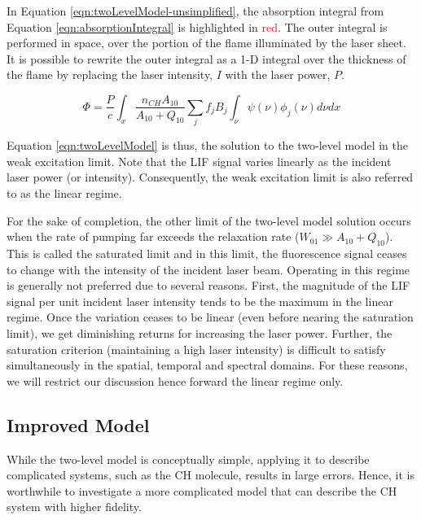 In Equation \ref{eqn:twoLevelModel-unsimplified}, the absorption integral from Equation \ref{eqn:absorptionIntegral} is highlighted in \textcolor{red}{red}.
The outer integral is performed in space, over the portion of the flame illuminated by the laser sheet.
It is possible to rewrite the outer integral as a 1-D integral over the thickness of the flame by replacing the laser intensity, \(I\) with the laser power, \(P\).

\begin{equation}
  \Phi = \frac{P}{c} \int_x \frac{n_{CH} A_{10}}{A_{10}+Q_{10}} \sum_j f_j B_j \int_\nu \psi(\nu) \phi_j(\nu) d\nu dx
  \label{eqn:twoLevelModel}
\end{equation}

Equation \ref{eqn:twoLevelModel} is thus, the solution to the two-level model in the weak excitation limit.
Note that the LIF signal varies linearly as the incident laser power (or intensity).
Consequently, the weak excitation limit is also referred to as the linear regime.

For the sake of completion, the other limit of the two-level model solution occurs when the rate of pumping far exceeds the relaxation rate (\(W_{01} \gg A_{10} + Q_{10}\)).
This is called the saturated limit and in this limit, the fluorescence signal ceases to change with the intensity of the incident laser beam.
Operating in this regime is generally not preferred due to several reasons.
First, the magnitude of the LIF signal per unit incident laser intensity tends to be the maximum in the linear regime.
Once the variation ceases to be linear (even before nearing the saturation limit), we get diminishing returns for increasing the laser power.
Further, the saturation criterion (maintaining a high laser intensity) is difficult to satisfy simultaneously in the spatial, temporal and spectral domains.
For these reasons, we will restrict our discussion hence forward the linear regime only.

\subsection{Improved Model}
\label{subsec:chplif-improved-model}

While the two-level model is conceptually simple, applying it to describe complicated systems, such as the CH molecule, results in large errors.\cite{1997-daily}
Hence, it is worthwhile to investigate a more complicated model that can describe the CH system with higher fidelity.

